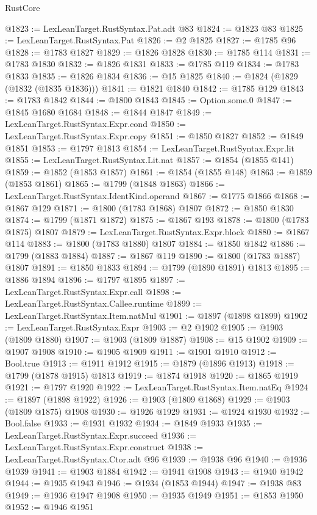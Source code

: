 \begin{lexlean}{RustCore}
\begin{coremodule}
@1823 := LexLeanTarget.RustSyntax.Pat.adt @83
@1824 := @1823 @83
@1825 := LexLeanTarget.RustSyntax.Pat
@1826 := @2 @1825
@1827 := @1785 @96
@1828 := @1783 @1827
@1829 := @1826 @1828
@1830 := @1785 @114
@1831 := @1783 @1830
@1832 := @1826 @1831
@1833 := @1785 @119
@1834 := @1783 @1833
@1835 := @1826 @1834
@1836 := @15 @1825
@1840 := @1824 (@1829 (@1832 (@1835 @1836)))
@1841 := @1821 @1840
@1842 := @1785 @129
@1843 := @1783 @1842
@1844 := @1800 @1843
@1845 := Option.some.{0}
@1847 := @1845 @1680 @1684
@1848 := @1844 @1847
@1849 := LexLeanTarget.RustSyntax.Expr.cond
@1850 := LexLeanTarget.RustSyntax.Expr.copy
@1851 := @1850 @1827
@1852 := @1849 @1851
@1853 := @1797 @1813
@1854 := LexLeanTarget.RustSyntax.Expr.lit
@1855 := LexLeanTarget.RustSyntax.Lit.nat
@1857 := @1854 (@1855 @141)
@1859 := @1852 (@1853 @1857)
@1861 := @1854 (@1855 @148)
@1863 := @1859 (@1853 @1861)
@1865 := @1799 (@1848 @1863)
@1866 := LexLeanTarget.RustSyntax.IdentKind.operand
@1867 := @1775 @1866
@1868 := @1867 @129
@1871 := @1800 (@1783 @1868) @1807
@1872 := @1850 @1830
@1874 := @1799 (@1871 @1872)
@1875 := @1867 @193
@1878 := @1800 (@1783 @1875) @1807
@1879 := LexLeanTarget.RustSyntax.Expr.block
@1880 := @1867 @114
@1883 := @1800 (@1783 @1880) @1807
@1884 := @1850 @1842
@1886 := @1799 (@1883 @1884)
@1887 := @1867 @119
@1890 := @1800 (@1783 @1887) @1807
@1891 := @1850 @1833
@1894 := @1799 (@1890 @1891) @1813
@1895 := @1886 @1894
@1896 := @1797 @1895
@1897 := LexLeanTarget.RustSyntax.Expr.call
@1898 := LexLeanTarget.RustSyntax.Callee.runtime
@1899 := LexLeanTarget.RustSyntax.Item.natMul
@1901 := @1897 (@1898 @1899)
@1902 := LexLeanTarget.RustSyntax.Expr
@1903 := @2 @1902
@1905 := @1903 (@1809 @1880)
@1907 := @1903 (@1809 @1887)
@1908 := @15 @1902
@1909 := @1907 @1908
@1910 := @1905 @1909
@1911 := @1901 @1910
@1912 := Bool.true
@1913 := @1911 @1912
@1915 := @1879 (@1896 @1913)
@1918 := @1799 (@1878 @1915) @1813
@1919 := @1874 @1918
@1920 := @1865 @1919
@1921 := @1797 @1920
@1922 := LexLeanTarget.RustSyntax.Item.natEq
@1924 := @1897 (@1898 @1922)
@1926 := @1903 (@1809 @1868)
@1929 := @1903 (@1809 @1875) @1908
@1930 := @1926 @1929
@1931 := @1924 @1930
@1932 := Bool.false
@1933 := @1931 @1932
@1934 := @1849 @1933
@1935 := LexLeanTarget.RustSyntax.Expr.succeed
@1936 := LexLeanTarget.RustSyntax.Expr.construct
@1938 := LexLeanTarget.RustSyntax.Ctor.adt @96
@1939 := @1938 @96
@1940 := @1936 @1939
@1941 := @1903 @1884
@1942 := @1941 @1908
@1943 := @1940 @1942
@1944 := @1935 @1943
@1946 := @1934 (@1853 @1944)
@1947 := @1938 @83
@1949 := @1936 @1947 @1908
@1950 := @1935 @1949
@1951 := @1853 @1950
@1952 := @1946 @1951

\end{coremodule}
\end{lexlean}
